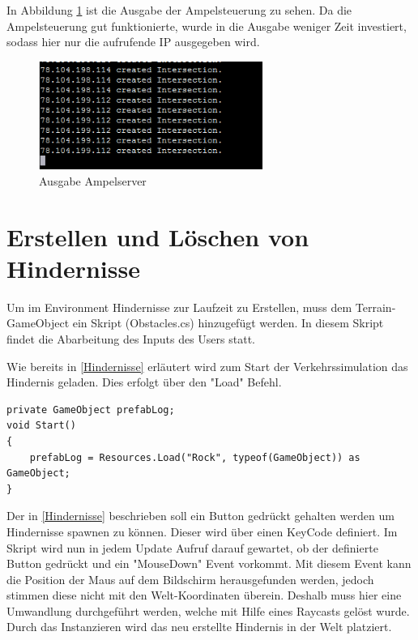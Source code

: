 In Abbildung \ref{img:ampel} ist die Ausgabe der Ampelsteuerung zu sehen. Da die Ampelsteuerung gut funktionierte, wurde in die Ausgabe weniger Zeit investiert, sodass hier nur die aufrufende IP ausgegeben wird.

\begin{figure}[H]
\begin{center}
	\includegraphics[width=0.65\textwidth]{BilderAllgemein/ampelserver.png}
\end{center}
	\caption{Ausgabe Ampelserver}
	\label{img:ampel}
\end{figure}



\section{Erstellen und Löschen von Hindernisse}

Um im Environment Hindernisse zur Laufzeit zu Erstellen, muss dem Terrain-GameObject ein Skript (Obstacles.cs) hinzugefügt werden. In diesem Skript findet die Abarbeitung des Inputs des Users statt.

Wie bereits in \ref{Hindernisse} erläutert wird zum Start der Verkehrssimulation das Hindernis geladen. Dies erfolgt über den "Load" Befehl.

\begin{lstlisting}[caption={Laden des Hindernisses},label={lst:Hinderniss_laden}]
private GameObject prefabLog;
void Start()
{
	prefabLog = Resources.Load("Rock", typeof(GameObject)) as GameObject;
}
\end{lstlisting}

Der in \ref{Hindernisse} beschrieben soll ein Button gedrückt gehalten werden um Hindernisse spawnen zu können. Dieser wird über einen KeyCode definiert. Im Skript wird nun in jedem Update Aufruf darauf gewartet, ob der definierte Button gedrückt und ein "MouseDown" Event vorkommt. Mit diesem Event kann die Position der Maus auf dem Bildschirm herausgefunden werden, jedoch stimmen diese nicht mit den Welt-Koordinaten überein. Deshalb muss hier eine Umwandlung durchgeführt werden, welche mit Hilfe eines Raycasts gelöst wurde. Durch das Instanzieren wird das neu erstellte Hindernis in der Welt platziert.


